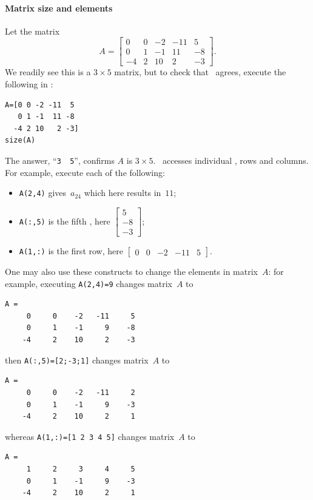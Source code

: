 \paragraph{Matrix size and elements}
Let the matrix
\begin{equation*}
A=\begin{bmatrix} 0 & 0 & -2 & -11 & 5\\ 0 & 1 & -1 & 11 & -8\\ -4 & 2 & 10 & 2 & -3 \end{bmatrix}.
\end{equation*}
We readily see this is a \(3\times5\) matrix, but to check that \script\ agrees, execute the following in \script: 
\begin{verbatim}
A=[0 0 -2 -11  5
   0 1 -1  11 -8
  -4 2 10   2 -3]
size(A)
\end{verbatim}
\setbox\ajrqrbox\hbox{}%
\marginajrbox%
The answer, ``\verb|3  5|'', confirms \(A\) is \(3\times5\).
\script\ accesses individual , rows and columns.
For example, execute each of the following:
\begin{itemize}
\item \verb|A(2,4)| gives~\(a_{24}\) which here results in~\(11\);
\item \verb|A(:,5)| is the fifth , here \(\begin{bmatrix} 5\\ -8\\ -3 \end{bmatrix}\);
\item \verb|A(1,:)| is the first row, here \(\begin{bmatrix} 0 & 0 & -2 & -11 & 5 \end{bmatrix}\).
\end{itemize}
One may also use these constructs to change the elements in matrix~\(A\): for example, executing
\verb|A(2,4)=9| changes matrix~\(A\) to
\begin{verbatim}
A =
     0     0    -2   -11     5
     0     1    -1     9    -8
    -4     2    10     2    -3
\end{verbatim}
then \verb|A(:,5)=[2;-3;1]| changes matrix~\(A\) to
\begin{verbatim}
A =
     0     0    -2   -11     2
     0     1    -1     9    -3
    -4     2    10     2     1
\end{verbatim}
whereas \verb|A(1,:)=[1 2 3 4 5]| changes matrix~\(A\) to
\begin{verbatim}
A =
     1     2     3     4     5
     0     1    -1     9    -3
    -4     2    10     2     1
\end{verbatim}


